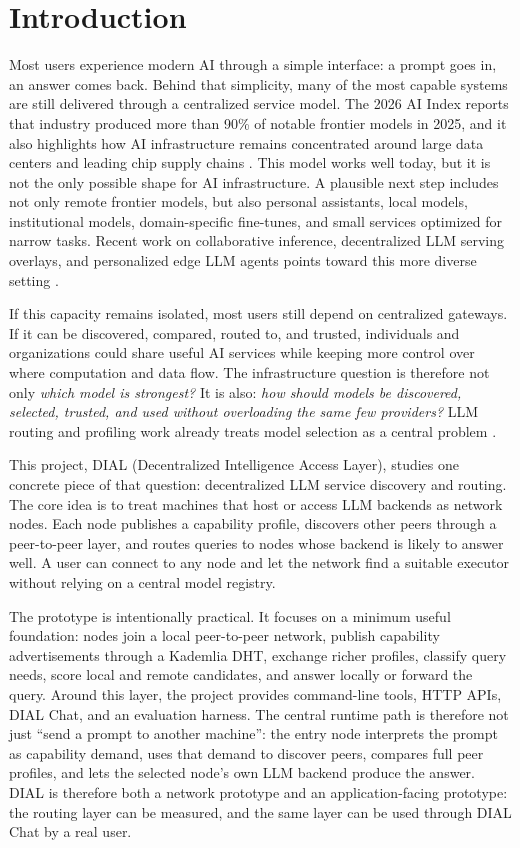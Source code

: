 \section{Introduction}

Most users experience modern AI through a simple interface: a prompt goes in,
an answer comes back. Behind that simplicity, many of the most capable systems
are still delivered through a centralized service model. The 2026 AI Index
reports that industry produced more than 90\% of notable frontier models in
2025, and it also highlights how AI infrastructure remains concentrated around
large data centers and leading chip supply chains
\citep{stanford2026aiindex}. This model works well today, but it is not the
only possible shape for AI infrastructure. A plausible next step includes not
only remote frontier models, but also personal assistants, local models,
institutional models, domain-specific fine-tunes, and small services optimized
for narrow tasks. Recent work on collaborative inference, decentralized LLM
serving overlays, and personalized edge LLM agents points toward this more
diverse setting
\citep{borzunov2023petals,fang2026planetserve,wang2026ppai}.

If this capacity remains isolated, most users still depend on centralized
gateways. If it can be discovered, compared, routed to, and trusted,
individuals and organizations could share useful AI services while keeping
more control over where computation and data flow. The infrastructure question
is therefore not only \textit{which model is strongest?} It is also:
\textit{how should models be discovered, selected, trusted, and used without
overloading the same few providers?} LLM routing and profiling work already
treats model selection as a central problem
\citep{chen2023frugalgpt,ong2025routellm,xu2026routeprofile}.

This project, DIAL (Decentralized Intelligence Access Layer), studies one
concrete piece of that question: decentralized LLM service discovery and
routing. The core idea is to treat machines that host or access LLM backends
as network nodes. Each node publishes a capability profile, discovers other
peers through a peer-to-peer layer, and routes queries to nodes whose backend
is likely to answer well. A user can connect to any node and let the network
find a suitable executor without relying on a central model registry.

The prototype is intentionally practical. It focuses on a minimum useful
foundation: nodes join a local peer-to-peer network, publish capability
advertisements through a Kademlia DHT, exchange richer profiles, classify query
needs, score local and remote candidates, and answer locally or forward the
query. Around this layer, the project provides command-line tools, HTTP APIs,
DIAL Chat, and an evaluation harness. The central runtime path is therefore not
just ``send a prompt to another machine'': the entry node interprets the prompt
as capability demand, uses that demand to discover peers, compares full peer
profiles, and lets the selected node's own LLM backend produce the answer.
DIAL is therefore both a network prototype and an application-facing prototype:
the routing layer can be measured, and the same layer can be used through DIAL
Chat by a real user.

